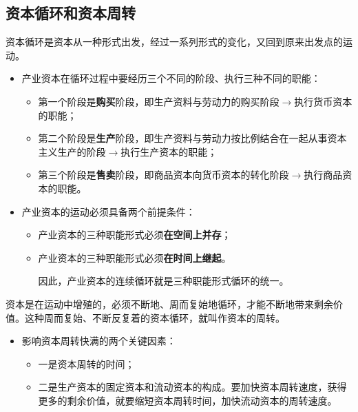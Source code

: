 \documentclass[12pt,openany]{ctexbook}
\begin{document}
\subsection{资本循环和资本周转}
\begin{mdquote}
资本循环是资本从一种形式出发，经过一系列形式的变化，又回到原来出发点的运动。
\end{mdquote}
\begin{itemize}
  \item 产业资本在循环过程中要经历三个不同的阶段、执行三种不同的职能：
\begin{itemize}
  \item 第一个阶段是\textbf{购买}阶段，即生产资料与劳动力的购买阶段$\to$执行货币资本的职能；
  \item 第二个阶段是\textbf{生产}阶段，即生产资料与劳动力按比例结合在一起从事资本主义生产的阶段$\to$执行生产资本的职能；
  \item 第三个阶段是\textbf{售卖}阶段，即商品资本向货币资本的转化阶段$\to$执行商品资本的职能。
\end{itemize}
  \item 产业资本的运动必须具备两个前提条件：
\begin{itemize}
  \item 产业资本的三种职能形式必须\textbf{在空间上并存}；
  \item 产业资本的三种职能形式必须\textbf{在时间上继起}。
  \par 因此，产业资本的连续循环就是三种职能形式循环的统一。
\end{itemize}
\end{itemize}
\begin{mdquote}
资本是在运动中增殖的，必须不断地、周而复始地循环，才能不断地带来剩余价值。这种周而复始、不断反复着的资本循环，就叫作资本的周转。
\end{mdquote}
\begin{itemize}
  \item 影响资本周转快满的两个关键因素：
\begin{itemize}
  \item 一是资本周转的时间；
  \item 二是生产资本的固定资本和流动资本的构成。要加快资本周转速度，获得更多的剩余价值，就要缩短资本周转时间，加快流动资本的周转速度。
\end{itemize}
\end{itemize}
\end{document}
